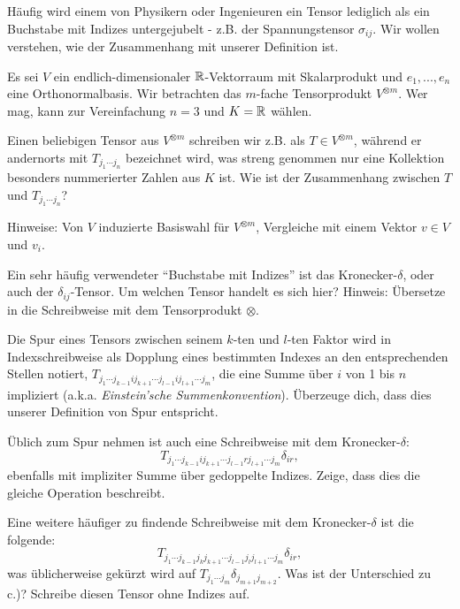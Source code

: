 \begin{sheet}
\begin{problem}[title={Aber Tensoren sind doch so Buchstaben mit Indizes}]
	\label{ex:TensorenMitIndizes}
	Häufig wird einem von Physikern oder Ingenieuren ein Tensor lediglich als ein Buchstabe mit Indizes untergejubelt - z.B. der Spannungstensor $\sigma_{ij}$. Wir wollen verstehen, wie der Zusammenhang mit unserer Definition ist.
	
	Es sei $V$ ein endlich-dimensionaler $\mathbb{R}$-Vektorraum mit Skalarprodukt und $e_1, ..., e_n$ eine Orthonormalbasis. Wir betrachten das $m$-fache Tensorprodukt $V^{\otimes m}$. Wer mag, kann zur Vereinfachung $n=3$ und $K=\mathbb{R}$ wählen.
	\begin{subproblem}
		Einen beliebigen Tensor aus $V^{\otimes m}$ schreiben wir z.B. als $T\in V^{\otimes m}$, während er andernorts mit $T_{j_1 \cdots j_n}$ bezeichnet wird, was streng genommen nur eine Kollektion besonders nummerierter Zahlen aus $K$ ist. Wie ist der Zusammenhang zwischen $T$ und $T_{j_1 \cdots j_n}$?
		
		Hinweise: Von $V$ induzierte Basiswahl für $V^{\otimes m}$, Vergleiche mit einem Vektor $v\in V$ und $v_i$.
	\end{subproblem}
	\begin{subproblem}
		Ein sehr häufig verwendeter \enquote{Buchstabe mit Indizes} ist das Kronecker-$\delta$, oder auch der $\delta_{ij}$-Tensor.
		Um welchen Tensor handelt es sich hier?
		Hinweis: Übersetze in die Schreibweise mit dem Tensorprodukt $\otimes$.			
	\end{subproblem}
	\begin{subproblem}
		Die Spur eines Tensors zwischen seinem $k$-ten und $l$-ten Faktor wird in Indexschreibweise als Dopplung eines bestimmten Indexes an den entsprechenden Stellen notiert, $T_{j_1\cdots j_{k-1} i j_{k+1} \cdots j_{l-1} i j_{l+1}  \cdots j_m}$, die eine Summe über $i$ von 1 bis $n$ impliziert (a.k.a. \emph{Einstein'sche Summenkonvention}). Überzeuge dich, dass dies unserer Definition von Spur entspricht. 
		
		Üblich zum Spur nehmen ist auch eine Schreibweise mit dem Kronecker-$\delta$: \[T_{j_1\cdots j_{k-1} i j_{k+1} \cdots j_{l-1} r j_{l+1}  \cdots j_m} \delta_{ir},\] ebenfalls mit impliziter Summe über gedoppelte Indizes. Zeige, dass dies die gleiche Operation beschreibt. 
	\end{subproblem}
	\begin{subproblem}
		Eine weitere häufiger zu findende Schreibweise mit dem Kronecker-$\delta$ ist die folgende:
		\[T_{j_1\cdots j_{k-1} j_{k} j_{k+1} \cdots j_{l-1} j_l j_{l+1}  \cdots j_m} \delta_{ir},\]
		was üblicherweise gekürzt wird auf $T_{j_1\cdots j_m} \delta_{j_{m+1} j_{m+2}}$. Was ist der Unterschied zu c.)? Schreibe diesen Tensor ohne Indizes auf.
	\end{subproblem}
\end{problem}


\end{sheet}
